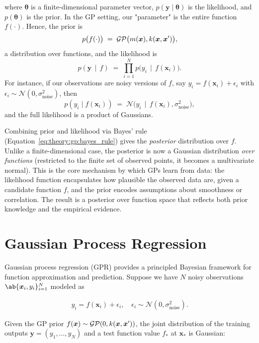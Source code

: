 where \(\bm{\theta}\) is a finite-dimensional parameter vector, \(p(\bm{y} \mid \bm{\theta})\) is the likelihood, and \(p(\bm{\theta})\) is the prior. In the GP setting, our "parameter" is the entire function \(f(\cdot)\). Hence, the prior is 
\[
  p\bigl(f(\cdot)\bigr) \;=\; \mathcal{GP}\bigl(m(\bm{x}), k(\bm{x},\bm{x}')\bigr),
\]
a distribution over functions, and the likelihood is
\[
  p(\bm{y} \,\mid\, f) \;=\; \prod_{i=1}^N p\bigl(y_i \,\mid\, f(\bm{x}_i)\bigr).
\]
For instance, if our observations are noisy versions of \(f\), say \(y_i = f(\bm{x}_i) + \epsilon_i\) with \(\epsilon_i \sim \mathcal{N}(0,\sigma_{\text{noise}}^2)\), then
\[
  p(y_i \mid f(\bm{x}_i)) \;=\; \mathcal{N}\bigl(y_i \,\mid\, f(\bm{x}_i), \sigma_{\text{noise}}^2\bigr),
\]
and the full likelihood is a product of Gaussians.

Combining prior and likelihood via Bayes' rule (Equation~\eqref{eq:theory:gp:bayes_rule}) gives the \emph{posterior} distribution over $f$. Unlike a finite-dimensional case, the posterior is now a Gaussian distribution \emph{over functions} (restricted to the finite set of observed points, it becomes a multivariate normal). This is the core mechanism by which GPs learn from data: the likelihood function encapsulates how plausible the observed data are, given a candidate function $f$, and the prior encodes assumptions about smoothness or correlation. The result is a posterior over function space that reflects both prior knowledge and the empirical evidence.


\section{Gaussian Process Regression}\label{sec:gp:regression}

Gaussian process regression (GPR) provides a principled Bayesian framework for function approximation and prediction. Suppose we have $N$ noisy observations $\ab \{ \bm{x}_i, y_i \}_{i=1}^N$ modeled as

\begin{align}\label{eq:theory:gp:generating_process}
    y_i = f(\bm{x}_i) + \epsilon_i, \quad \epsilon_i \sim \mathcal{N}(0, \sigma_{\text{noise}}^2).
\end{align}

Given the GP prior $f(\bm{x}) \sim \mathcal{GP}(0,k(\bm{x},\bm{x}'))$, the joint distribution of the training outputs $\bm{y}=(y_1,\dots,y_N)$ and a test function value $f_*$ at $\bm{x}_*$ is Gaussian:

